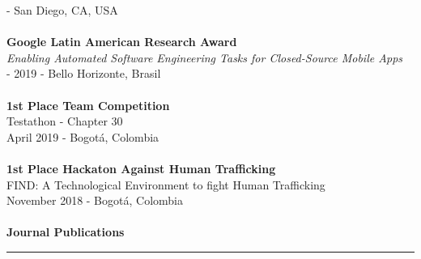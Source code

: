 \documentclass[letterpaper,11pt,oneside]{article}
\begin{document}
 - San Diego, CA, USA \\
\\
\noindent \indent \textbf{Google Latin American Research Award} \\
\indent \textit{Enabling Automated Software Engineering Tasks for Closed-Source Mobile Apps}\\
 - 2019 - Bello Horizonte, Brasil \\
\\
\noindent \indent \textbf{1st Place Team Competition} \\
\indent Testathon - Chapter 30\\
\indent April 2019 - Bogotá, Colombia \\
\\
\noindent \indent \textbf{1st Place Hackaton Against Human Trafficking} \\
\indent FIND: A Technological Environment to fight Human Trafficking\\
\indent November 2018 - Bogotá, Colombia \\
\\ \newpage
\noindent \Large{\textbf{Journal Publications}} \\
\vspace{-2ex}
\hrule 
\normalsize
\vspace{0.5cm}
\end{document}
